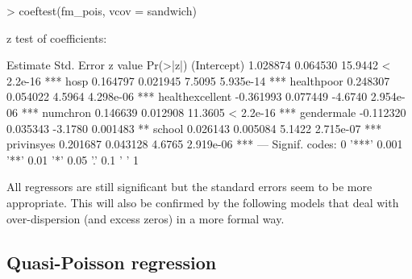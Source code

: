 \documentclass{Z}
\begin{document}
\begin{Schunk}
\begin{Sinput}
> coeftest(fm_pois, vcov = sandwich)
\end{Sinput}
\begin{Soutput}
z test of coefficients:

                 Estimate Std. Error z value  Pr(>|z|)    
(Intercept)      1.028874   0.064530 15.9442 < 2.2e-16 ***
hosp             0.164797   0.021945  7.5095 5.935e-14 ***
healthpoor       0.248307   0.054022  4.5964 4.298e-06 ***
healthexcellent -0.361993   0.077449 -4.6740 2.954e-06 ***
numchron         0.146639   0.012908 11.3605 < 2.2e-16 ***
gendermale      -0.112320   0.035343 -3.1780  0.001483 ** 
school           0.026143   0.005084  5.1422 2.715e-07 ***
privinsyes       0.201687   0.043128  4.6765 2.919e-06 ***
---
Signif. codes:  0 '***' 0.001 '**' 0.01 '*' 0.05 '.' 0.1 ' ' 1 
\end{Soutput}
\end{Schunk}
All regressors are still significant but the standard errors seem to be more
appropriate. This will also be confirmed by the following models that
deal with over-dispersion (and excess zeros) in a more formal way.

\subsection{Quasi-Poisson regression}
\end{document}
